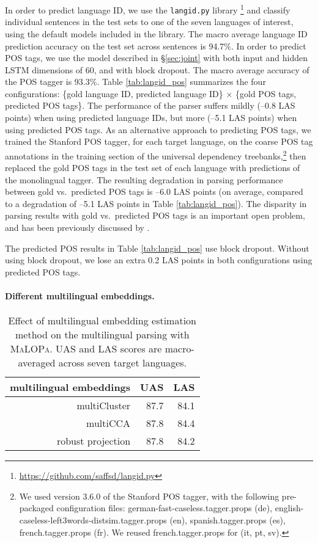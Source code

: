 \documentclass[11pt]{article}
\newcommand{\malopa}{\textsc{MaLOPa}}
\begin{document}
In order to predict language ID, we use the \texttt{langid.py} library \cite{lui:12}\footnote{\url{https://github.com/saffsd/langid.py}} and classify individual sentences in the test sets to one of the seven languages of interest, using the default models included in the library.
The macro average language ID prediction accuracy on the test set across sentences is 94.7\%.
In order to predict POS tags, we use the model described in \S\ref{sec:joint} with both input and hidden LSTM dimensions of 60, and with block dropout.
The macro average accuracy of the POS tagger is 93.3\%.
Table \ref{tab:langid_pos} summarizes the four configurations: \{gold language ID, predicted language ID\} $\times$ \{gold POS tags, predicted POS tags\}.
The performance of the parser suffers mildly (--0.8 LAS points) when using predicted language IDs, but more (--5.1 LAS points) when using predicted POS tags.
As an alternative approach to predicting POS tags, we trained the Stanford POS tagger, for each target language, on the coarse POS tag annotations in the training section of the universal dependency treebanks,\footnote{We used version 3.6.0 of the Stanford POS tagger, with the following pre-packaged configuration files: german-fast-caseless.tagger.props (de), english-caseless-left3words-distsim.tagger.props (en), spanish.tagger.props (es), french.tagger.props (fr). We reused french.tagger.props for (it, pt, sv).} then replaced the gold POS tags in the test set of each language with predictions of the monolingual tagger.
The resulting degradation in parsing performance between gold vs.~predicted POS tags is --6.0 LAS points (on average, compared to a degradation of --5.1 LAS points in Table \ref{tab:langid_pos}).
The disparity in parsing results with gold vs.~predicted POS tags is an important open problem, and has been previously discussed by .

The predicted POS results in Table \ref{tab:langid_pos} use block dropout.
Without using block dropout, we lose an extra 0.2 LAS points in both configurations using predicted POS tags.

\paragraph{Different multilingual embeddings.}

\begin{table}[!]
\centering
\begin{tabular}{r|r|r}
multilingual embeddings           & UAS & LAS   \\ \hline
multiCluster           & 87.7  & 84.1   \\
multiCCA               & 87.8  & 84.4   \\
robust projection      & 87.8  & 84.2
\end{tabular}

\caption{Effect of multilingual embedding estimation method on the multilingual parsing with \malopa.
UAS and LAS scores are macro-averaged across seven target languages.
\label{tab:multilingual_embeddings}}
\end{table}
\end{document}
